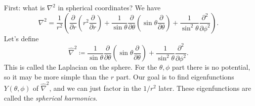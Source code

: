 First: what is $\nabla ^2$ in spherical coordinates? We have
\[
	\nabla ^2=\frac{1}{r^2} \left( \frac{\partial }{\partial r} \left( r^2 \frac{\partial }{\partial r}  \right) +\frac{1}{\sin \theta } \frac{\partial }{\partial \theta } \left( \sin \theta \frac{\partial }{\partial \theta }  \right) +\frac{1}{\sin ^2\theta } \frac{\partial ^2}{\partial \phi ^2}  \right) 
.\]
Let's define
\[
	\hat{\nabla}^2 \coloneqq \frac{1}{\sin \theta } \frac{\partial }{\partial \theta } \left( \sin \theta \frac{\partial }{\partial \theta }  \right) +\frac{1}{\sin ^2\theta } \frac{\partial ^2}{\partial \phi ^2} 
.\]
This is called the Laplacian on the sphere. For the $\theta ,\phi $ part there is no potential, so it may be more simple than the $r$ part. Our goal is to find eigenfunctions $Y(\theta ,\phi )$ of $\hat{\nabla }^2$, and we can just factor in the $1/r^2$ later. These eigenfunctions are called the \emph{spherical harmonics}.

